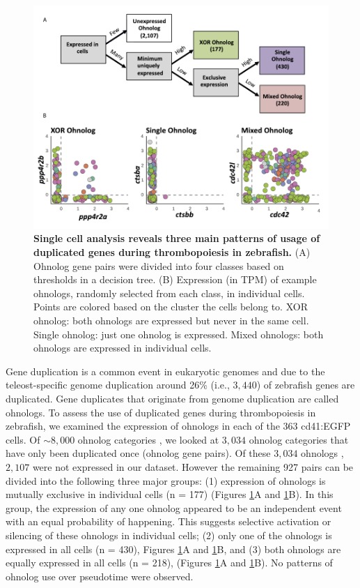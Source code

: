 \begin{figure}
    \centering
    \includegraphics[width=\textwidth]{"Figure7"}
    \caption[Single cell analysis reveals three main patterns of usage of duplicated genes during thrombopoiesis in zebrafish]{\textbf{Single cell analysis reveals three main patterns of usage of duplicated genes during thrombopoiesis in zebrafish.} (A) Ohnolog gene pairs were divided into four classes based on thresholds in a decision tree. (B) Expression (in TPM) of example ohnologs, randomly selected from each class, in individual cells. Points are colored based on the cluster the cells belong to. XOR ohnolog: both ohnologs are expressed but never in the same cell. Single ohnolog: just one ohnolog is expressed. Mixed ohnologs: both ohnologs are expressed in individual cells.}
    \label{fig:ohnologs}
\end{figure}

Gene duplication is a common event in eukaryotic genomes \cite{Meyer1999-lb} and due to the teleost-specific genome duplication around 26\% (i.e., \( 3,440 \)) \cite{Howe2013-ul} of zebrafish genes are duplicated. Gene duplicates that originate from genome duplication are called ohnologs. To assess the use of duplicated genes during thrombopoiesis in zebrafish, we examined the expression of ohnologs in each of the 363 cd41:EGFP cells. Of \( \sim 8,000 \) ohnolog categories \cite{Howe2013-ul}, we looked at \( 3,034 \) ohnolog categories that have only been duplicated once (ohnolog gene pairs). Of these \( 3,034 \) ohnologs \cite{Howe2013-ul}, \( 2,107 \) were not expressed in our dataset. However the remaining 927 pairs can be divided into the following three major groups: (1) expression of ohnologs is mutually exclusive in individual cells (n = 177) (Figures \ref{fig:ohnologs}A and \ref{fig:ohnologs}B). In this group, the expression of any one ohnolog appeared to be an independent event with an equal probability of happening. This suggests selective activation or silencing of these ohnologs in individual cells; (2) only one of the ohnologs is expressed in all cells (n = 430), Figures \ref{fig:ohnologs}A and \ref{fig:ohnologs}B, and (3) both ohnologs are equally expressed in all cells (n = 218), (Figures \ref{fig:ohnologs}A and \ref{fig:ohnologs}B). No patterns of ohnolog use over pseudotime were observed.


